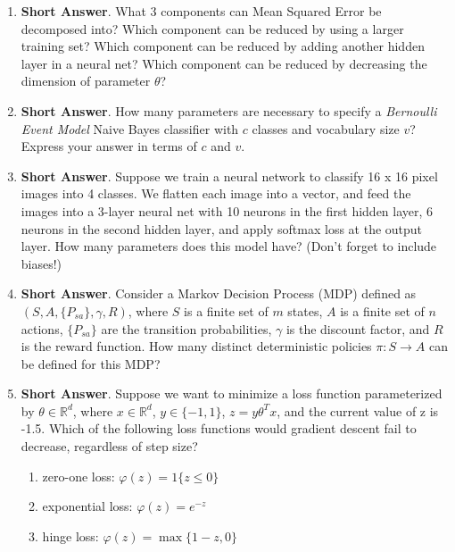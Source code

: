 \documentclass{article}
\newif\ifsolutions
\newenvironment{labelledanswer}{{\bf Answer:} \sf }{}%
\newcommand{\answer}[2]
{{
\ifsolutions
\begin{labelledanswer}
\color{red} 
#2
\end{labelledanswer}
\else
#1
\fi
}}
\begin{document}
\begin{enumerate}

\item \textbf{Short Answer}. 
What 3 components can Mean Squared Error be decomposed into? Which component can be reduced by using a larger training set? Which component can be reduced by adding another hidden layer in a neural net? Which component can be reduced by decreasing the dimension of parameter $\theta$?

\answer{}{}

\item \textbf{Short Answer}. 
How many parameters are necessary to specify a \emph{Bernoulli Event Model} Naive Bayes classifier with $c$ classes and vocabulary size $v$? Express your answer in terms of $c$ and $v$.

\answer{}{}

\item \textbf{Short Answer}.
Suppose we train a neural network to classify 16 x 16 pixel images into 4 classes. We flatten each image into a vector, and feed the images into a 3-layer neural net with 10 neurons in the first hidden layer, 6 neurons in the second hidden layer, and apply softmax loss at the output layer. How many parameters does this model have? (Don't forget to include biases!)

\answer{}{}

\item \textbf{Short Answer}.
Consider a Markov Decision Process (MDP) defined as $(S, A, \{P_{sa}\}, \gamma, R)$, where $S$ is a finite set of $m$ states, $A$ is a finite set of $n$ actions, $\{P_{sa}\}$ are the transition probabilities, $\gamma$ is the discount factor, and $R$ is the reward function.
How many distinct deterministic policies $\pi:S\to A$ can be defined for this MDP?

\answer{}{}

\item \textbf{Short Answer}. Suppose we want to minimize a loss function parameterized by $\theta \in \mathbb{R}^d$, where $x \in \mathbb{R}^d$, $y \in \{-1, 1\}$, $z = y \theta^T x$, and the current value of z is -1.5. Which of the following loss functions would gradient descent fail to decrease, regardless of step size?
    \begin{enumerate}
        \item zero-one loss: $\varphi(z) = 1\{z \le 0\}$
        \item exponential loss: $\varphi(z) = e^{-z}$
        \item hinge loss: $\varphi(z) = \max\{1-z, 0\}$
    \end{enumerate}
\answer{}{}

\end{enumerate}
\end{document}
